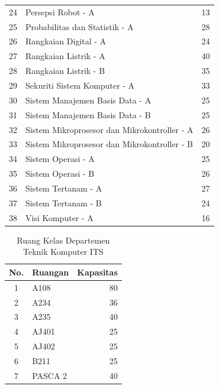 \begin{longtable}{|c|l|r|}
  24 & Persepsi Robot - A                            & 13 \\
  25 & Probabilitas dan Statistik - A                & 28 \\
  26 & Rangkaian Digital - A                         & 24 \\
  27 & Rangkaian Listrik - A                         & 40 \\
  28 & Rangkaian Listrik - B                         & 35 \\
  29 & Sekuriti Sistem Komputer - A                  & 33 \\
  30 & Sistem Manajemen Basis Data - A               & 25 \\
  31 & Sistem Manajemen Basis Data - B               & 25 \\
  32 & Sistem Mikroprosesor dan Mikrokontroller - A  & 26 \\
  33 & Sistem Mikroprosesor dan Mikrokontroller - B  & 20 \\
  34 & Sistem Operasi - A                            & 25 \\
  35 & Sistem Operasi - B                            & 26 \\
  36 & Sistem Tertanam - A                           & 27 \\
  37 & Sistem Tertanam - B                           & 24 \\
  38 & Visi Komputer - A                             & 16 \\    
  \hline
\end{longtable}

\begin{longtable}{|c|l|r|}
  \caption{Ruang Kelas Departemen Teknik Komputer ITS}
  \label{tb:ruang}\\
  \hline
  \rowcolor[HTML]{D0CECE} 
  No. & Ruangan & Kapasitas \\ \hline
  1   & A108                                                 & 80                                                     \\ 
  2   & A234                                                 & 36                                                     \\ 
  3   & A235                                                 & 40                                                     \\ 
  4   & AJ401                                                & 25                                                     \\ 
  5   & AJ402                                                & 25                                                     \\ 
  6   & B211                                                 & 25                                                     \\ 
  7   & PASCA 2                                              & 40                                                     \\ 
  \hline
\end{longtable}

